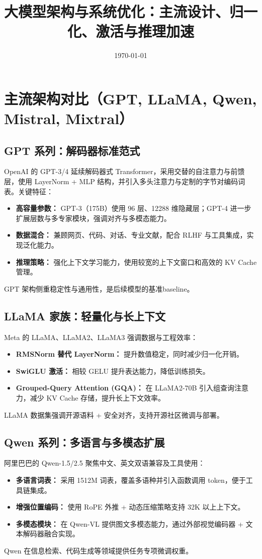 \documentclass[UTF8,zihao=-4]{ctexart}
\title{大模型架构与系统优化：主流设计、归一化、激活与推理加速}
\author{}
\date{\today}
\begin{document}
\maketitle

\section{主流架构对比（GPT, LLaMA, Qwen, Mistral, Mixtral）}
\subsection{GPT 系列：解码器标准范式}
OpenAI 的 GPT-3/4 延续解码器式 Transformer，采用交替的自注意力与前馈层，使用 LayerNorm + MLP 结构，并引入多头注意力与定制的字节对编码词表。关键特征：
\begin{itemize}
  \item \textbf{高容量参数：} GPT-3（175B）使用 96 层、12288 维隐藏层；GPT-4 进一步扩展层数与多专家模块，强调对齐与多模态能力。
  \item \textbf{数据混合：} 兼顾网页、代码、对话、专业文献，配合 RLHF 与工具集成，实现泛化能力。
  \item \textbf{推理策略：} 强化上下文学习能力，使用较宽的上下文窗口和高效的 KV Cache 管理。
\end{itemize}
GPT 架构侧重稳定性与通用性，是后续模型的基准baseline。

\subsection{LLaMA 家族：轻量化与长上下文}
Meta 的 LLaMA、LLaMA2、LLaMA3 强调数据与工程效率：
\begin{itemize}
  \item \textbf{RMSNorm 替代 LayerNorm：} 提升数值稳定，同时减少归一化开销。
  \item \textbf{SwiGLU 激活：} 相较 GELU 提升表达能力，降低训练损失。
  \item \textbf{Grouped-Query Attention (GQA)：} 在 LLaMA2-70B 引入组查询注意力，减少 KV Cache 存储，提升长上下文效率。
\end{itemize}
LLaMA 数据集强调开源语料 + 安全对齐，支持开源社区微调与部署。

\subsection{Qwen 系列：多语言与多模态扩展}
阿里巴巴的 Qwen-1.5/2.5 聚焦中文、英文双语兼容及工具使用：
\begin{itemize}
  \item \textbf{多语言词表：} 采用 1512M 词表，覆盖多语种并引入函数调用 token，便于工具链集成。
  \item \textbf{增强位置编码：} 使用 RoPE 外推 + 动态压缩策略支持 32K 以上上下文。
  \item \textbf{多模态模块：} 在 Qwen-VL 提供图文多模态能力，通过外部视觉编码器 + 文本解码器融合实现。
\end{itemize}
Qwen 在信息检索、代码生成等领域提供任务专项微调权重。
\end{document}
